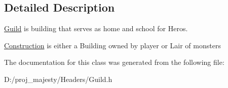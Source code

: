 \subsection{Detailed Description}
\hyperlink{class_guild}{Guild} is building that serves as home and school for Heros. 

\hyperlink{class_construction}{Construction} is either a Building owned by player or Lair of monsters 

The documentation for this class was generated from the following file\+:\begin{DoxyCompactItemize}
\item 
D\+:/proj\+\_\+majesty/\+Headers/Guild.\+h\end{DoxyCompactItemize}
